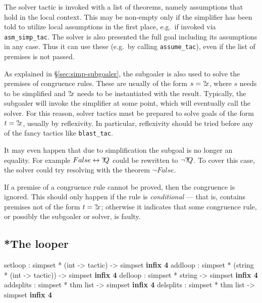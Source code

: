 \medskip

 The solver tactic is invoked
with a list of theorems, namely assumptions that hold in the local
context.  This may be non-empty only if the simplifier has been told
to utilize local assumptions in the first place, e.g.\ if invoked via
\texttt{asm_simp_tac}.  The solver is also presented the full goal
including its assumptions in any case.  Thus it can use these (e.g.\ 
by calling \texttt{assume_tac}), even if the list of premises is not
passed.

\medskip

As explained in {\S}\ref{sec:simp-subgoaler}, the subgoaler is also used
to solve the premises of congruence rules.  These are usually of the
form $s = {?\!x}$, where $s$ needs to be simplified and ${?\!x}$
needs to be instantiated with the result.  Typically, the subgoaler
will invoke the simplifier at some point, which will eventually call
the solver.  For this reason, solver tactics must be prepared to solve
goals of the form $t = {?\!x}$, usually by reflexivity.  In
particular, reflexivity should be tried before any of the fancy
tactics like \texttt{blast_tac}.

It may even happen that due to simplification the subgoal is no longer
an equality.  For example $False \leftrightarrow {?\!Q}$ could be rewritten to
$\neg{?\!Q}$.  To cover this case, the solver could try resolving
with the theorem $\neg False$.

\medskip

\begin{warn}
  If a premise of a congruence rule cannot be proved, then the
  congruence is ignored.  This should only happen if the rule is
  \emph{conditional} --- that is, contains premises not of the form $t
  = {?\!x}$; otherwise it indicates that some congruence rule, or
  possibly the subgoaler or solver, is faulty.
\end{warn}


\subsection{*The looper}\label{sec:simp-looper}
\begin{ttbox}
setloop   : simpset *           (int -> tactic)  -> simpset \hfill{\bf infix 4}
addloop   : simpset * (string * (int -> tactic)) -> simpset \hfill{\bf infix 4}
delloop   : simpset *  string                    -> simpset \hfill{\bf infix 4}
addsplits : simpset * thm list -> simpset \hfill{\bf infix 4}
delsplits : simpset * thm list -> simpset \hfill{\bf infix 4}
\end{ttbox}

